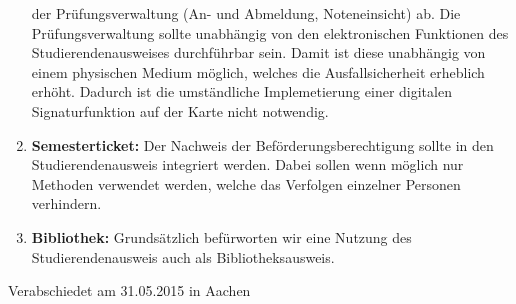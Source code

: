 \documentclass[DIV=calc]{scrartcl}
\begin{document}
\begin{enumerate}
{    der Prüfungsverwaltung (An- und Abmeldung, Noteneinsicht) ab. Die Prüfungsverwaltung sollte
    unabhängig von den elektronischen Funktionen des Studierendenausweises durchführbar sein.
    Damit ist diese unabhängig von einem physischen Medium möglich, welches die Ausfallsicherheit
    erheblich erhöht. Dadurch ist die umständliche Implemetierung einer digitalen Signaturfunktion
    auf der Karte nicht notwendig.}
    \item{\textbf{Semesterticket:} Der Nachweis der Beförderungsberechtigung sollte in den Studierendenausweis
    integriert werden. Dabei sollen wenn möglich nur Methoden verwendet werden, welche das
    Verfolgen einzelner Personen verhindern.}
    \item{\textbf{Bibliothek:} Grundsätzlich befürworten wir eine Nutzung des Studierendenausweis auch als
    Bibliotheksausweis.}
\end{enumerate}

\vfill
\begin{flushright}
Verabschiedet am 31.05.2015 in Aachen
\end{flushright}
\end{document}
